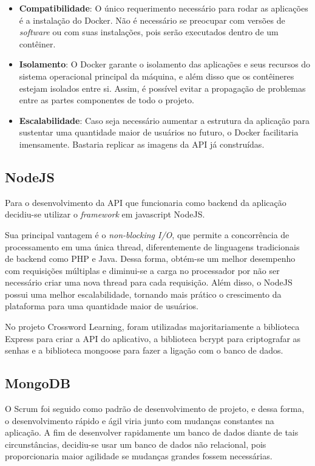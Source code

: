 \begin{itemize}
    \item \textbf{Compatibilidade}: O único requerimento necessário para rodar as aplicações é a instalação do Docker. Não é necessário se preocupar com versões de \textit{software} ou com suas instalações, pois serão executados dentro de um contêiner.
    
    \item \textbf{Isolamento}: O Docker garante o isolamento das aplicações e seus recursos do sistema operacional principal da máquina, e além disso que os contêineres estejam isolados entre si. Assim, é possível evitar a propagação de problemas entre as partes componentes de todo o projeto.
    
    \item \textbf{Escalabilidade}: Caso seja necessário aumentar a estrutura da aplicação para sustentar uma quantidade maior de usuários no futuro, o Docker facilitaria imensamente. Bastaria replicar as imagens da API já construídas.
\end{itemize}


\subsection{NodeJS}
Para o desenvolvimento da API que funcionaria como backend da aplicação decidiu-se utilizar o \textit{framework} em javascript NodeJS. 

Sua principal vantagem é o \textit{non-blocking I/O}, que permite a concorrência
de processamento em uma única thread, diferentemente de linguagens tradicionais de backend como PHP e Java. Dessa forma, obtém-se um melhor desempenho com requisições múltiplas e diminui-se a carga no processador por não ser necessário criar uma nova thread para cada requisição. Além disso, o NodeJS possui uma melhor escalabilidade,
tornando mais prático o crescimento da plataforma para uma quantidade maior de usuários.

No projeto Crossword Learning, foram utilizadas majoritariamente a biblioteca Express para criar a API do aplicativo, a biblioteca bcrypt para criptografar as senhas e a biblioteca mongoose para fazer a ligação com o banco de dados.

\subsection{MongoDB}
O Scrum foi seguido como padrão de desenvolvimento de projeto, e dessa forma, o desenvolvimento rápido e ágil viria junto com mudanças constantes na aplicação.
A fim de desenvolver rapidamente um banco de dados diante de tais circunstâncias, decidiu-se usar um banco de dados não relacional, pois proporcionaria maior agilidade se mudanças grandes fossem necessárias.

